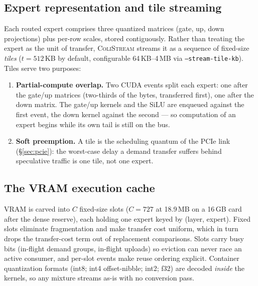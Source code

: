 \documentclass[11pt]{article}
\theoremstyle{definition}
\theoremstyle{remark}
\newcommand{\colistream}{\textsc{ColiStream}}
\begin{document}
\subsection{Expert representation and tile streaming}\label{sec:tiles}
Each routed expert comprises three quantized matrices (gate, up, down
projections) plus per-row scales, stored contiguously. Rather than treating
the expert as the unit of transfer, \colistream{} streams it as a sequence of
fixed-size \emph{tiles} ($t = 512$\,KB by default, configurable
64\,KB--4\,MB via \texttt{--stream-tile-kb}). Tiles serve two purposes:
\begin{enumerate}
\item \textbf{Partial-compute overlap.} Two CUDA events split each expert:
one after the gate/up matrices (two-thirds of the bytes, transferred first),
one after the down matrix. The gate/up kernels and the SiLU are enqueued
against the first event, the down kernel against the second --- so
computation of an expert begins while its own tail is still on the bus.
\item \textbf{Soft preemption.} A tile is the scheduling quantum of the PCIe
link (\S\ref{sec:pcie}): the worst-case delay a demand transfer suffers
behind speculative traffic is one tile, not one expert.
\end{enumerate}

\subsection{The VRAM execution cache}
VRAM is carved into $C$ fixed-size slots ($C{=}727$ at 18.9\,MB on a 16\,GB
card after the dense reserve), each holding one expert keyed by (layer,
expert). Fixed slots eliminate fragmentation and make transfer cost uniform,
which in turn drops the transfer-cost term out of replacement comparisons.
Slots carry busy bits (in-flight demand groups, in-flight uploads) so
eviction can never race an active consumer, and per-slot events make reuse
ordering explicit. Container quantization formats (int8; int4 offset-nibble;
int2; f32) are decoded \emph{inside} the kernels, so any mixture streams
as-is with no conversion pass.
\end{document}
